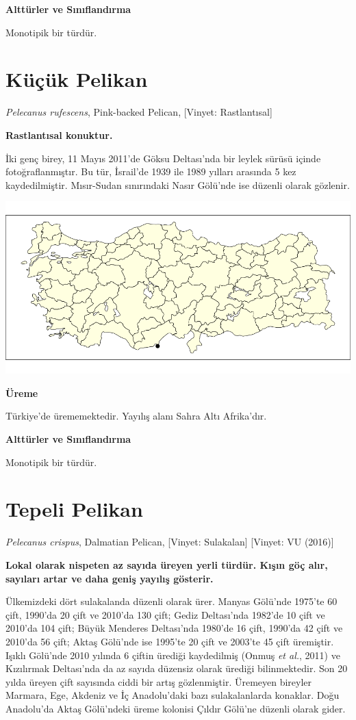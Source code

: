 \documentclass[
  a4paper,
  DIV=11,
  numbers=noendperiod]{scrreprt}
\begin{document}
\textbf{Alttürler ve Sınıflandırma}

Monotipik bir türdür.

\section{Küçük Pelikan}\label{kuxfcuxe7uxfck-pelikan}

\emph{Pelecanus rufescens}, Pink-backed Pelican, {[}Vinyet:
Rastlantısal{]}

\textbf{Rastlantısal konuktur.}

İki genç birey, 11 Mayıs 2011'de Göksu Deltası'nda bir leylek sürüsü
içinde fotoğraflanmıştır. Bu tür, İsrail'de 1939 ile 1989 yılları
arasında 5 kez kaydedilmiştir. Mısır-Sudan sınırındaki Nasır Gölü'nde
ise düzenli olarak gözlenir.

\includegraphics{images/harita_Pelecanus_rufescens.png}

\textbf{Üreme}

Türkiye'de ürememektedir. Yayılış alanı Sahra Altı Afrika'dır.

\textbf{Alttürler ve Sınıflandırma}

Monotipik bir türdür.

\section{Tepeli Pelikan}\label{tepeli-pelikan}

\emph{Pelecanus crispus}, Dalmatian Pelican, {[}Vinyet: Sulakalan{]}
{[}Vinyet: VU (2016){]}

\textbf{Lokal olarak nispeten az sayıda üreyen yerli türdür. Kışın göç
alır, sayıları artar ve daha geniş yayılış gösterir.}

Ülkemizdeki dört sulakalanda düzenli olarak ürer. Manyas Gölü'nde
1975'te 60 çift, 1990'da 20 çift ve 2010'da 130 çift; Gediz Deltası'nda
1982'de 10 çift ve 2010'da 104 çift; Büyük Menderes Deltası'nda 1980'de
16 çift, 1990'da 42 çift ve 2010'da 56 çift; Aktaş Gölü'nde ise 1995'te
20 çift ve 2003'te 45 çift üremiştir. Işıklı Gölü'nde 2010 yılında 6
çiftin ürediği kaydedilmiş (Onmuş \emph{et al.}, 2011) ve Kızılırmak
Deltası'nda da az sayıda düzensiz olarak ürediği bilinmektedir. Son 20
yılda üreyen çift sayısında ciddi bir artış gözlenmiştir. Üremeyen
bireyler Marmara, Ege, Akdeniz ve İç Anadolu'daki bazı sulakalanlarda
konaklar. Doğu Anadolu'da Aktaş Gölü'ndeki üreme kolonisi Çıldır Gölü'ne
düzenli olarak gider.
\end{document}
